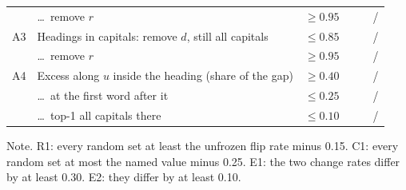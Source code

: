 \begin{table}[H]
\begin{tabularx}{\textwidth}{@{}l Y l l l l@{}}
 & \dots\ remove $r$ & $\ge 0.95$ &  &  &  /  \\
A3 & Headings in capitals: remove $d$, still all capitals & $\le 0.85$ &  &  &  /  \\
 & \dots\ remove $r$ & $\ge 0.95$ &  &  &  /  \\
A4 & Excess along $u$ inside the heading (share of the gap) & $\ge 0.40$ &  &  &  /  \\
 & \dots\ at the first word after it & $\le 0.25$ &  &  &  /  \\
 & \dots\ top-1 all capitals there & $\le 0.10$ &  &  &  /  \\
\bottomrule
\end{tabularx}
\par\smallskip\raggedright Note. R1: every random set at least the unfrozen flip rate minus 0.15. C1: every random set at most the named value minus 0.25. E1: the two change rates differ by at least 0.30. E2: they differ by at least 0.10.
\end{table}
